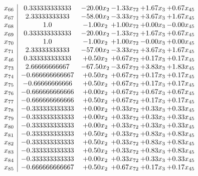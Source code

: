 \documentclass[8pt]{article}
\begin{document}
\[\begin{array}{c| c c@{\hskip 2pt} c@{\hskip 2pt} c@{\hskip 2pt} c@{\hskip 2pt} }
 x_{66}   &  0.333333333333 & -20.00 x_{2} & -1.33 x_{72} & +  1.67 x_{3} & +  0.67 x_{45}\\
 x_{67}   &  2.33333333333 & -58.00 x_{2} & -3.33 x_{72} & +  3.67 x_{3} & +  1.67 x_{45}\\
 x_{68}   &  1.0 & -1.00 x_{2} & +  1.00 x_{72} & +  0.00 x_{3} & -0.00 x_{45}\\
 x_{69}   &  0.333333333333 & -20.00 x_{2} & -1.33 x_{72} & +  1.67 x_{3} & +  0.67 x_{45}\\
 x_{70}   &  1.0 & -1.00 x_{2} & +  1.00 x_{72} & -0.00 x_{3} & +  0.00 x_{45}\\
 x_{71}   &  2.33333333333 & -57.00 x_{2} & -3.33 x_{72} & +  3.67 x_{3} & +  1.67 x_{45}\\
 x_{46}   &  0.333333333333 & +  0.50 x_{2} & +  0.67 x_{72} & +  0.17 x_{3} & +  0.17 x_{45}\\
 x_{73}   &  2.66666666667 & -67.50 x_{2} & -3.67 x_{72} & +  3.83 x_{3} & +  1.83 x_{45}\\
 x_{74}   &  -0.666666666667 & +  0.50 x_{2} & +  0.67 x_{72} & +  0.17 x_{3} & +  0.17 x_{45}\\
 x_{75}   &  -0.66666666666 & +  0.50 x_{2} & +  0.67 x_{72} & +  0.17 x_{3} & +  0.17 x_{45}\\
 x_{76}   &  -0.666666666666 & +  0.00 x_{2} & +  0.67 x_{72} & +  0.67 x_{3} & +  0.67 x_{45}\\
 x_{77}   &  -0.666666666666 & +  0.50 x_{2} & +  0.67 x_{72} & +  0.17 x_{3} & +  0.17 x_{45}\\
 x_{78}   &  -0.333333333333 & +  0.00 x_{2} & +  0.33 x_{72} & +  0.33 x_{3} & +  0.33 x_{45}\\
 x_{79}   &  -0.333333333333 & +  0.00 x_{2} & +  0.33 x_{72} & +  0.33 x_{3} & +  0.33 x_{45}\\
 x_{80}   &  -0.333333333333 & +  0.00 x_{2} & +  0.33 x_{72} & +  0.33 x_{3} & +  0.33 x_{45}\\
 x_{81}   &  -0.333333333333 & +  0.50 x_{2} & +  0.33 x_{72} & +  0.83 x_{3} & +  0.83 x_{45}\\
 x_{82}   &  -0.333333333333 & +  0.50 x_{2} & +  0.33 x_{72} & +  0.83 x_{3} & +  0.83 x_{45}\\
 x_{83}   &  -0.333333333333 & +  0.50 x_{2} & +  0.33 x_{72} & +  0.83 x_{3} & +  0.83 x_{45}\\
 x_{84}   &  -0.333333333333 & +  0.00 x_{2} & +  0.33 x_{72} & +  0.33 x_{3} & +  0.33 x_{45}\\
 x_{85}   &  -0.666666666667 & +  0.50 x_{2} & +  0.67 x_{72} & +  0.17 x_{3} & +  0.17 x_{45}\\

\end{array}\]
\end{document}
